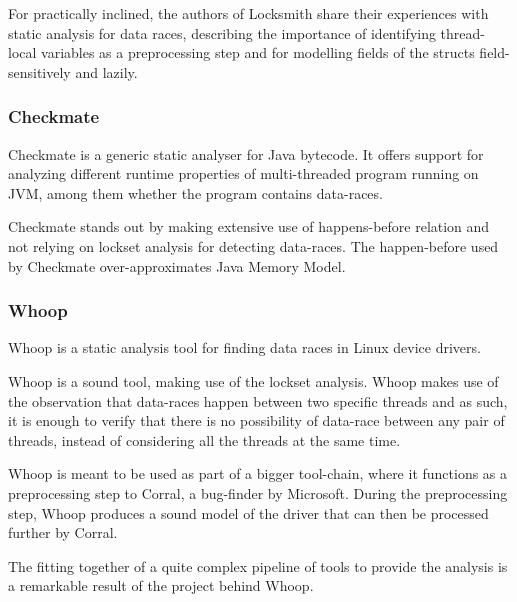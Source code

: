 \documentclass[..thesis.tex]{subfiles}
\begin{document}
For practically inclined, the authors of Locksmith share their experiences with static analysis for data races, describing the importance of identifying thread-local variables as a preprocessing step and for modelling fields of the structs field-sensitively and lazily\cite{pratikakis_locksmith_2011}.




\subsubsection{Checkmate}

Checkmate\cite{ferrara_checkmate_2009} is a generic static analyser for Java bytecode. It offers support for analyzing different runtime properties of multi-threaded program running on JVM, among them whether the program contains data-races.

Checkmate stands out by making extensive use of happens-before relation and not relying on lockset analysis for detecting data-races. The happen-before used by Checkmate over-approximates Java Memory Model.





\subsubsection{Whoop}

Whoop\cite{deligiannis_fast_2015} is a static analysis tool for finding data races in Linux device drivers. 

Whoop is a sound tool, making use of the lockset analysis. Whoop makes use of the observation that data-races happen between two specific threads and as such, it is enough to verify that there is no possibility of data-race between any pair of threads, instead of considering all the threads at the same time.

Whoop is meant to be used as part of a bigger tool-chain, where it functions as a preprocessing step to Corral, a bug-finder by Microsoft. During the preprocessing step, Whoop produces a sound model of the driver that can then be processed further by Corral.

The fitting together of a quite complex pipeline of tools to provide the analysis is a remarkable result of the project behind Whoop.
\end{document}
